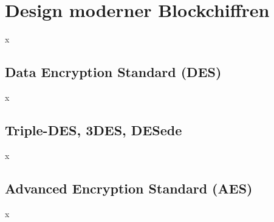 \chapter{Design moderner Blockchiffren}
x

\section{Data Encryption Standard (DES)}
x

\section{Triple-DES, 3DES, DESede}
x

\section{Advanced Encryption Standard (AES)}
x
